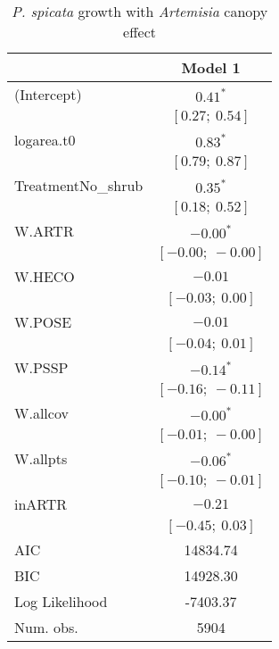 \documentclass[11pt]{article}
\begin{document}
\begin{table}
\caption{\textit{P. spicata} growth with \textit{Artemisia} canopy effect}
\begin{center}
\begin{tabular}{l c }
\hline
 & Model 1 \\
\hline
(Intercept)                      & $0.41^{*}$        \\
                                 & $[0.27;\ 0.54]$   \\
logarea.t0                       & $0.83^{*}$        \\
                                 & $[0.79;\ 0.87]$   \\
TreatmentNo\_shrub               & $0.35^{*}$        \\
                                 & $[0.18;\ 0.52]$   \\
W.ARTR                           & $-0.00^{*}$       \\
                                 & $[-0.00;\ -0.00]$ \\
W.HECO                           & $-0.01$           \\
                                 & $[-0.03;\ 0.00]$  \\
W.POSE                           & $-0.01$           \\
                                 & $[-0.04;\ 0.01]$  \\
W.PSSP                           & $-0.14^{*}$       \\
                                 & $[-0.16;\ -0.11]$ \\
W.allcov                         & $-0.00^{*}$       \\
                                 & $[-0.01;\ -0.00]$ \\
W.allpts                         & $-0.06^{*}$       \\
                                 & $[-0.10;\ -0.01]$ \\
inARTR                           & $-0.21$           \\
                                 & $[-0.45;\ 0.03]$  \\
\hline
AIC                              & 14834.74          \\
BIC                              & 14928.30          \\
Log Likelihood                   & -7403.37          \\
Num. obs.                        & 5904              \\

\end{tabular}
\end{center}
\end{table}
\end{document}
